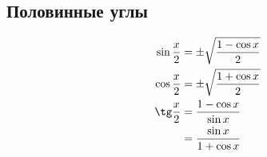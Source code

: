 \subsection*{Половинные углы}

\begin{align*}
  \sin \frac{x}{2}  &= \pm \sqrt{ \frac{1 - \cos x }{2} }\\
  \cos \frac{x}{2}  &= \pm \sqrt{ \frac{1 + \cos x }{2} }\\
  \tg \frac{x}{2}  &= \frac{1 - \cos x }{\sin x}\\
                    &= \frac{ \sin x }{ 1 + \cos x }
\end{align*}

\hrulefill